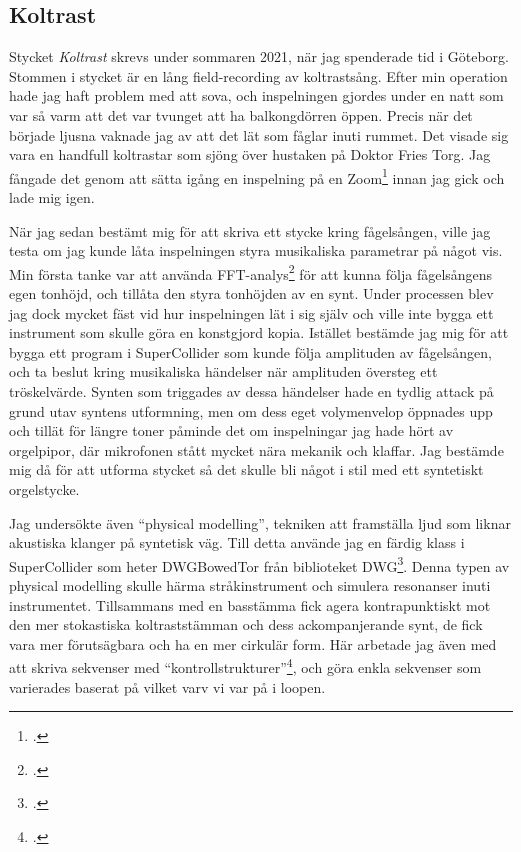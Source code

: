 \documentclass{article}
\begin{document}
\subsection{Koltrast}
Stycket \emph{Koltrast} skrevs under sommaren 2021, när jag spenderade tid i Göteborg. Stommen i stycket är en
lång field-recording av koltrastsång. Efter min operation hade jag haft problem med att sova, och inspelningen
gjordes under en natt som var så varm att det var tvunget att ha balkongdörren öppen. Precis när det började
ljusna vaknade jag av att det lät som fåglar inuti rummet. Det visade sig vara en handfull koltrastar som
sjöng över hustaken på Doktor Fries Torg. Jag fångade det genom att sätta igång en inspelning på en  
Zoom\footcite{zoom} innan
jag gick och lade mig igen. 

När jag sedan bestämt mig för att skriva ett stycke kring fågelsången, ville jag
testa om jag kunde låta inspelningen styra musikaliska parametrar på något vis. Min första tanke var att
använda FFT-analys\footcite{fft} för att kunna följa
fågelsångens egen tonhöjd, och tillåta den styra tonhöjden av en synt. Under processen blev jag dock
mycket fäst vid hur inspelningen lät i sig själv och ville inte bygga ett instrument som skulle göra en
konstgjord kopia. Istället bestämde jag mig för att bygga ett program i
SuperCollider som kunde följa amplituden av fågelsången, och ta beslut kring musikaliska händelser när
amplituden översteg ett tröskelvärde. Synten som triggades av dessa händelser hade en tydlig attack på grund
utav syntens utformning, men om dess eget volymenvelop öppnades upp och tillät för längre toner påminde det om
inspelningar jag hade hört av orgelpipor, där mikrofonen stått mycket nära mekanik och klaffar. 
Jag bestämde mig då för att utforma stycket så det skulle bli något i stil med ett syntetiskt orgelstycke.

Jag undersökte även ``physical modelling'', tekniken att framställa ljud som liknar akustiska klanger på
syntetisk väg. Till detta använde jag en färdig klass i SuperCollider som heter DWGBowedTor från biblioteket
DWG\footcite{dwg}. Denna typen av physical modelling skulle
härma stråkinstrument och simulera resonanser inuti instrumentet. Tillsammans med en basstämma fick agera
kontrapunktiskt mot den mer stokastiska koltraststämman och dess ackompanjerande synt, de fick vara mer
förutsägbara och ha en mer cirkulär form. Här arbetade jag även med att skriva sekvenser med
``kontrollstrukturer''\footcite{ctrl}, och göra
enkla sekvenser som varierades baserat på vilket varv vi var på i loopen.
\pagebreak
\end{document}
